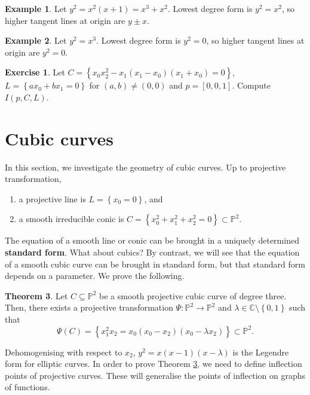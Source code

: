 \documentclass{article}
\newcommand{\C}{\mathbb{C}}
\renewcommand{\P}{\mathbb{P}}
\newcommand{\rb}[1]{\left( #1 \right)}
\renewcommand{\sb}[1]{\left[ #1 \right]}
\newcommand{\cb}[1]{\left\{ #1 \right\}}
\theoremstyle{definition}\newtheorem{definition}{Definition}[section]
\theoremstyle{definition}\newtheorem{notation}[definition]{Notation}
\theoremstyle{definition}\newtheorem{remark}[definition]{Remark}
\theoremstyle{definition}\newtheorem{example}[definition]{Example}
\theoremstyle{definition}\newtheorem{fact}{Fact}
\theoremstyle{definition}\newtheorem{exercise}{Exercise}
\newtheorem{theorem}[definition]{Theorem}
\begin{document}
\begin{example}
Let $ y^2 = x^2\rb{x + 1} = x^3 + x^2 $. Lowest degree form is $ y^2 = x^2 $, so higher tangent lines at origin are $ y \pm x $.
\end{example}

\begin{example}
Let $ y^2 = x^3 $. Lowest degree form is $ y^2 = 0 $, so higher tangent lines at origin are $ y^2 = 0 $.
\end{example}

\begin{exercise}
Let $ C = \cb{x_0x_2^2 - x_1\rb{x_1 - x_0}\rb{x_1 + x_0} = 0} $, $ L = \cb{ax_0 + bx_1 = 0} $ for $ \rb{a, b} \ne \rb{0, 0} $ and $ p = \sb{0, 0, 1} $. Compute $ I\rb{p, C, L} $.
\end{exercise}

\section{Cubic curves}

In this section, we investigate the geometry of cubic curves. Up to projective transformation,
\begin{enumerate}
\item a projective line is $ L = \cb{x_0 = 0} $, and
\item a smooth irreducible conic is $ C = \cb{x_0^2 + x_1^2 + x_2^2 = 0} \subset \P^2 $.
\end{enumerate}
The equation of a smooth line or conic can be brought in a uniquely determined \textbf{standard form}. What about cubics? By contrast, we will see that the equation of a smooth cubic curve can be brought in standard form, but that standard form depends on a parameter. We prove the following.

\begin{theorem}
\label{thm:13.1}
Let $ C \subseteq \P^2 $ be a smooth projective cubic curve of degree three. Then, there exists a projective transformation $ \Psi : \P^2 \to \P^2 $ and $ \lambda \in \C \setminus \cb{0, 1} $ such that
$$ \Psi\rb{C} = \cb{x_1^2x_2 = x_0\rb{x_0 - x_2}\rb{x_0 - \lambda x_2}} \subset \P^2. $$
\end{theorem}

Dehomogenising with respect to $ x_2 $, $ y^2 = x\rb{x - 1}\rb{x - \lambda} $ is the Legendre form for elliptic curves. In order to prove Theorem \ref{thm:13.1}, we need to define inflection points of projective curves. These will generalise the points of inflection on graphs of functions.
\end{document}
